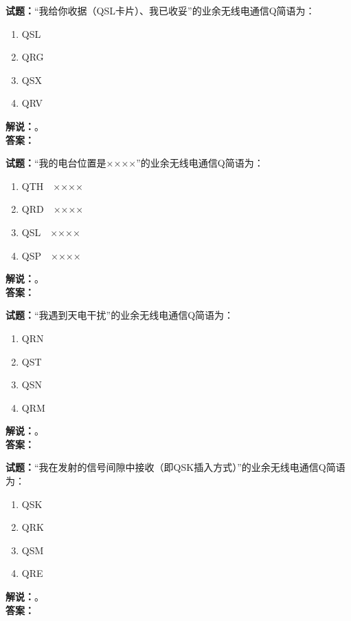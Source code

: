 \documentclass{ctexbook}
\begin{document}
\bigskip




\noindent\textbf{试题：}“我给你收据（QSL卡片）、我已收妥”的业余无线电通信Q简语为：
\begin{enumerate}[leftmargin=3em]
\item QSL
\item QRG
\item QSX
\item QRV
\end{enumerate}
\noindent\textbf{解说：}\textbf{}。\\\noindent\textbf{答案：}

\bigskip




\noindent\textbf{试题：}“我的电台位置是××××”的业余无线电通信Q简语为：
\begin{enumerate}[leftmargin=3em]
\item QTH　××××
\item QRD　××××
\item QSL　××××
\item QSP　××××
\end{enumerate}
\noindent\textbf{解说：}\textbf{}。\\\noindent\textbf{答案：}

\bigskip




\noindent\textbf{试题：}“我遇到天电干扰”的业余无线电通信Q简语为：
\begin{enumerate}[leftmargin=3em]
\item QRN
\item QST
\item QSN
\item QRM
\end{enumerate}
\noindent\textbf{解说：}\textbf{}。\\\noindent\textbf{答案：}

\bigskip




\noindent\textbf{试题：}“我在发射的信号间隙中接收（即QSK插入方式）”的业余无线电通信Q简语为：
\begin{enumerate}[leftmargin=3em]
\item QSK
\item QRK
\item QSM
\item QRE
\end{enumerate}
\noindent\textbf{解说：}\textbf{}。\\\noindent\textbf{答案：}
\end{document}
